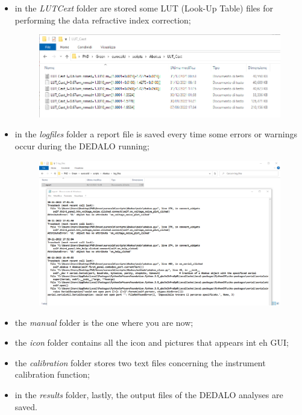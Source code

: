 \documentclass[a4paper, 11pt]{report}
\begin{document}
\begin{itemize}
\begin{figure}[!htb]
\end{figure}
\newpage
\item in the \textit{LUT\textunderscore Cext} folder are stored some LUT (Look-Up Table) files for performing the data refractive index correction;
\begin{figure}[!htb]
	\centering
	\includegraphics[scale=0.71]{folder_4.png}
\end{figure}
\item in the \textit{log\textunderscore files} folder a report file is saved every time some errors or warnings occur during the DEDALO running;
\begin{figure}[!htb]
	\centering
	\includegraphics[scale=0.45]{folder_5.png}
\end{figure}
\item the \textit{manual} folder is the one where you are now;
\item the \textit{\textunderscore icon} folder contains all the icon and pictures that appears int eh GUI;
\item the \textit{\textunderscore calibration} folder stores two text files concerning the instrument calibration function;
\item in the \textit{results} folder, lastly, the output files of the DEDALO analyses are saved.
\end{itemize}
\end{document}
